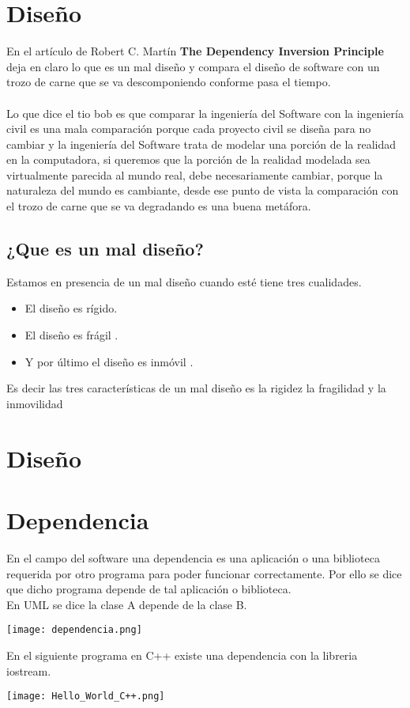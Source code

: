 \documentclass[12pt]{book}
\begin{document}
\section{Diseño}
En el artículo de Robert C. Martín \textbf{The Dependency Inversion Principle} deja en claro lo que es un mal diseño y compara el diseño de software con un trozo de carne que se va descomponiendo conforme pasa el tiempo.
\\
\\
Lo que dice el tio bob es que comparar la ingeniería del Software con la ingeniería civil es una mala comparación porque cada proyecto civil se diseña para no cambiar y la ingeniería del Software trata de modelar una porción de la realidad en la computadora, si queremos que la porción de la realidad modelada sea virtualmente parecida al mundo real, debe necesariamente cambiar, porque la naturaleza del mundo es cambiante, desde ese punto de vista la comparación con el trozo de carne que se va degradando es una buena metáfora.
\subsection{¿Que es un mal diseño?}


Estamos en presencia de un mal diseño cuando esté tiene tres cualidades.
\begin{itemize}
 \item El diseño es rígido.
 \item El diseño es frágil .
 \item Y por último el diseño es inmóvil .
 \end{itemize} Es decir las tres características de un mal diseño es la rigidez la fragilidad y la inmovilidad

\section{Diseño}



\section{Dependencia} En el campo del software una dependencia es una aplicación o una biblioteca requerida por otro programa para poder funcionar correctamente. Por ello se dice que dicho programa depende de tal aplicación o biblioteca.
\\
En UML se dice la clase A depende de la clase B.
\\
\begin{center}
\texttt{[image: dependencia.png]}
\end{center}
En el siguiente programa en C++ existe una dependencia con la libreria iostream.\\
\begin{center}
\texttt{[image: Hello\_World\_C++.png]}
\end{center}
\end{document}
